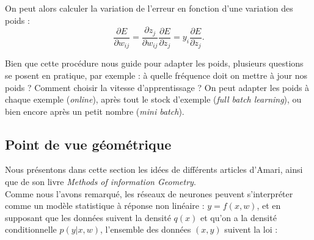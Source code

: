 \documentclass{article}
\theoremstyle{definition}
\begin{document}
\\
\\
On peut alors calculer la variation de l'erreur en fonction d'une variation des poids :
\[\frac{\partial E}{\partial w_{ij}}=\frac{\partial z_j}{\partial w_{ij}}\frac{\partial E}{\partial z_j}=y_i\frac{\partial E}{\partial z_j}.\]

Bien que cette procédure nous guide pour adapter les poids, plusieurs questions se posent en pratique, par exemple : à quelle fréquence doit on mettre à jour nos poids ? Comment choisir la vitesse d'apprentissage ? On peut adapter les poids à chaque exemple (\textit{online}), après tout le stock d'exemple (\textit{full batch learning}), ou bien encore après un petit nombre (\textit{mini batch}).\\


\subsection{Point de vue géométrique}

Nous présentons dans cette section les idées de différents articles d'Amari, ainsi que de son livre \textit{Methods of information Geometry}.\cite{Amari}\\

Comme nous l'avons remarqué, les réseaux de neurones peuvent s'interpréter comme un modèle statistique à réponse non linéaire : $y=f(x,w)$, et en supposant que les données suivent la densité $q(x)$ et qu'on a la densité conditionnelle $p(y|x,w)$, l'ensemble des données $(x,y)$ suivent la loi :
\end{document}
